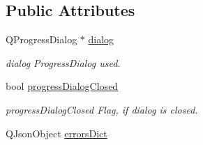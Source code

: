 \subsection*{Public Attributes}
\begin{DoxyCompactItemize}
\item 
Q\+Progress\+Dialog $\ast$ \mbox{\hyperlink{class_view_p_c_a31abbb470fe329b44e6ffee202b903ca}{dialog}}
\begin{DoxyCompactList}\small\item\em dialog Progress\+Dialog used. \end{DoxyCompactList}\item 
bool \mbox{\hyperlink{class_view_p_c_add8c82aa2b0b934212aa5bde9277ab36}{progress\+Dialog\+Closed}}
\begin{DoxyCompactList}\small\item\em progress\+Dialog\+Closed Flag, if dialog is closed. \end{DoxyCompactList}\item 
Q\+Json\+Object \mbox{\hyperlink{class_view_p_c_a26f90436aca32e5bad46f5e69a7e7e09}{errors\+Dict}}
\end{DoxyCompactItemize}
